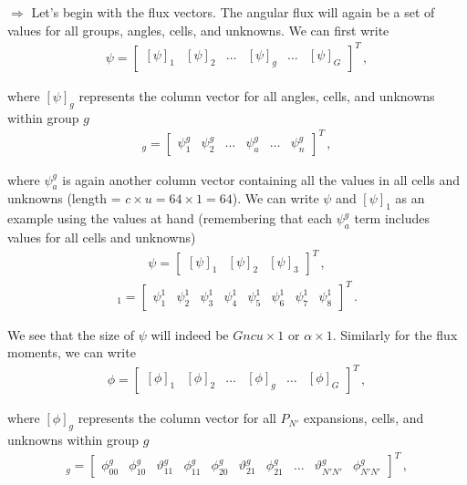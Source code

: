 \documentclass[10pt]{article}
\begin{document}
$\Rightarrow$ Let's begin with the flux vectors. The angular flux will again be a set of values for all groups, angles, cells, and unknowns. We can first write 
%
\begin{align*}
\psi =
\begin{bmatrix}
    [\psi]_1 & [\psi]_2 & \dots & [\psi]_g & \dots & [\psi]_G 
\end{bmatrix} ^ T\,,
\end{align*}

where $[\psi]_g$ represents the column vector for all angles, cells, and unknowns within group $g$
%
\begin{align*}
[\psi]_g =
\begin{bmatrix}
    \psi_1^g & \psi_2^g & \dots & \psi_a^g &  \dots & \psi_n^g
\end{bmatrix} ^ T\,,
\end{align*}

where $\psi_a^g$ is again another column vector containing all the values in all cells and unknowns (length = $c \times u = 64 \times 1 = 64$). We can write $\psi$ and $[\psi]_1$ as an example using the values at hand (remembering that each $\psi_a^g$ term includes values for all cells and unknowns)
%
\begin{align*}
\psi =
\begin{bmatrix}
    [\psi]_1 & [\psi]_2 & [\psi]_3
\end{bmatrix} ^ T\,,
\end{align*}
\vspace{-20pt}
\begin{align*}
[\psi]_1 =
\begin{bmatrix}
    \psi_1^1 & \psi_2^1 & \psi_3^1 & \psi_4^1 & \psi_5^1 & \psi_6^1 & \psi_7^1 & \psi_8^1
\end{bmatrix} ^ T\,.
\end{align*}

We see that the size of $\psi$ will indeed be $Gncu \times 1$ or $\alpha \times 1$. Similarly for the flux moments, we can write
%
\begin{align*}
\phi =
\begin{bmatrix}
    [\phi]_1 & [\phi]_2 & \dots & [\phi]_g & \dots & [\phi]_G 
\end{bmatrix} ^ T\,,
\end{align*}

where $[\phi]_g$ represents the column vector for all $P_{N'}$ expansions, cells, and unknowns within group $g$
%
\begin{align*}
[\phi]_g =
\begin{bmatrix}
    \phi_{00}^g & \phi_{10}^g & \vartheta_{11}^g & \phi_{11}^g & \phi_{20}^g & \vartheta_{21}^g & \phi_{21}^g &  \dots & \vartheta_{N'N'}^g & \phi_{N'N'}^g
\end{bmatrix} ^ T\,,
\end{align*}
\end{document}
